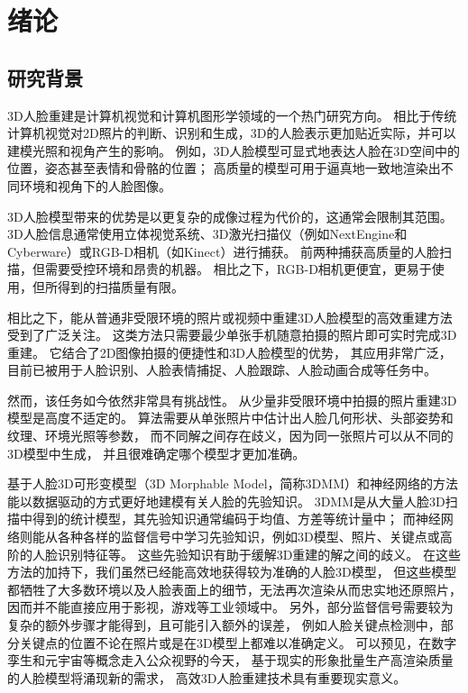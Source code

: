 \chapter{绪论}
\label{chap:intro}

\section{研究背景}

3D人脸重建是计算机视觉和计算机图形学领域的一个热门研究方向。
相比于传统计算机视觉对2D照片的判断、识别和生成，3D的人脸表示更加贴近实际，并可以建模光照和视角产生的影响。
例如，3D人脸模型可显式地表达人脸在3D空间中的位置，姿态甚至表情和骨骼的位置；
高质量的模型可用于逼真地一致地渲染出不同环境和视角下的人脸图像。

3D人脸模型带来的优势是以更复杂的成像过程为代价的，这通常会限制其范围。
3D人脸信息通常使用立体视觉系统\citep{DEP,ss_geo}、3D激光扫描仪（例如NextEngine和Cyberware）或RGB-D相机（如Kinect）进行捕获。
前两种捕获高质量的人脸扫描，但需要受控环境和昂贵的机器。
相比之下，RGB-D相机更便宜，更易于使用，但所得到的扫描质量有限。

相比之下，能从普通非受限环境的照片或视频中重建3D人脸模型的高效重建方法受到了广泛关注。
这类方法只需要最少单张手机随意拍摄的照片即可实时完成3D重建。
它结合了2D图像拍摄的便捷性和3D人脸模型的优势，
其应用非常广泛，目前已被用于人脸识别\citep{BlanzV03,1022631413.nh,zhu2015high}、人脸表情捕捉\cite{Mo2022TowardsAF}、人脸跟踪\citep{Pham2016RobustRP}、人脸动画合成\citep{Cao20133DSR,thies2016face2face}等任务中。

然而，该任务如今依然非常具有挑战性。
从少量非受限环境中拍摄的照片重建3D模型是高度不适定的。
算法需要从单张照片中估计出人脸几何形状、头部姿势和纹理、环境光照等参数，
而不同解之间存在歧义，因为同一张照片可以从不同的3D模型中生成，
并且很难确定哪个模型才更加准确。

基于人脸3D可形变模型（3D Morphable Model，简称3DMM）和神经网络的方法能以数据驱动的方式更好地建模有关人脸的先验知识。
3DMM是从大量人脸3D扫描中得到的统计模型，其先验知识通常编码于均值、方差等统计量中；
而神经网络则能从各种各样的监督信号中学习先验知识，例如3D模型、照片、关键点或高阶的人脸识别特征等。
这些先验知识有助于缓解3D重建的解之间的歧义。
在这些方法的加持下，我们虽然已经能高效地获得较为准确的人脸3D模型，
但这些模型都牺牲了大多数环境以及人脸表面上的细节，无法再次渲染从而忠实地还原照片，
因而并不能直接应用于影视，游戏等工业领域中。
另外，部分监督信号需要较为复杂的额外步骤才能得到，且可能引入额外的误差，
例如人脸关键点检测中，部分关键点的位置不论在照片或是在3D模型上都难以准确定义。
可以预见，在数字孪生和元宇宙等概念走入公众视野的今天，
基于现实的形象批量生产高渲染质量的人脸模型将涌现新的需求，
高效3D人脸重建技术具有重要现实意义。

